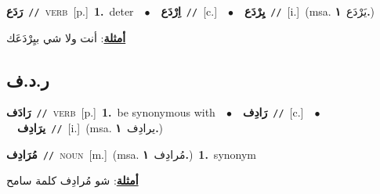 \documentclass[10pt,a4paper,twoside]{article} %
\begin{document}
\begin{multicols}{2}
{\setlength\topsep{0pt}\textbf{\foreignlanguage{arabic}{رَدَع}}\ {\color{gray}\texttt{//}\color{black}}\ \textsc{verb}\ [p.]\ \textbf{1.}~deter\ \ $\bullet$\ \ \setlength\topsep{0pt}\textbf{\foreignlanguage{arabic}{اِرْدَع}}\ {\color{gray}\texttt{//}\color{black}}\ [c.]\ \ $\bullet$\ \ \setlength\topsep{0pt}\textbf{\foreignlanguage{arabic}{يِرْدَع}}\ {\color{gray}\texttt{//}\color{black}}\ [i.]\ \color{gray}(msa. \foreignlanguage{arabic}{يَرْدَع}~\foreignlanguage{arabic}{\textbf{١.}})\color{black}\  \begin{flushright}\color{gray}\foreignlanguage{arabic}{\textbf{\underline{\foreignlanguage{arabic}{أمثلة}}}: أنت ولا شي بيِرْدَعَك}\end{flushright}\color{black}} \vspace{2mm}

\vspace{-3mm}
\subsection*{\color{blue}\foreignlanguage{arabic}{ر.د.ف}\color{blue}{}} 

{\setlength\topsep{0pt}\textbf{\foreignlanguage{arabic}{رَادَف}}\ {\color{gray}\texttt{//}\color{black}}\ \textsc{verb}\ [p.]\ \textbf{1.}~be synonymous with\ \ $\bullet$\ \ \setlength\topsep{0pt}\textbf{\foreignlanguage{arabic}{رَادِف}}\ {\color{gray}\texttt{//}\color{black}}\ [c.]\ \ $\bullet$\ \ \setlength\topsep{0pt}\textbf{\foreignlanguage{arabic}{يرَادِف}}\ {\color{gray}\texttt{//}\color{black}}\ [i.]\ \color{gray}(msa. \foreignlanguage{arabic}{يرادِف}~\foreignlanguage{arabic}{\textbf{١.}})\color{black}\ } \vspace{2mm}

{\setlength\topsep{0pt}\textbf{\foreignlanguage{arabic}{مُرَادِف}}\ {\color{gray}\texttt{//}\color{black}}\ \textsc{noun}\ [m.]\ \color{gray}(msa. \foreignlanguage{arabic}{مُرادِف}~\foreignlanguage{arabic}{\textbf{١.}})\color{black}\ \textbf{1.}~synonym\  \begin{flushright}\color{gray}\foreignlanguage{arabic}{\textbf{\underline{\foreignlanguage{arabic}{أمثلة}}}: شو مُرادِف كلمة سامح}\end{flushright}\color{black}} \vspace{2mm}


\end{multicols}
\end{document}
